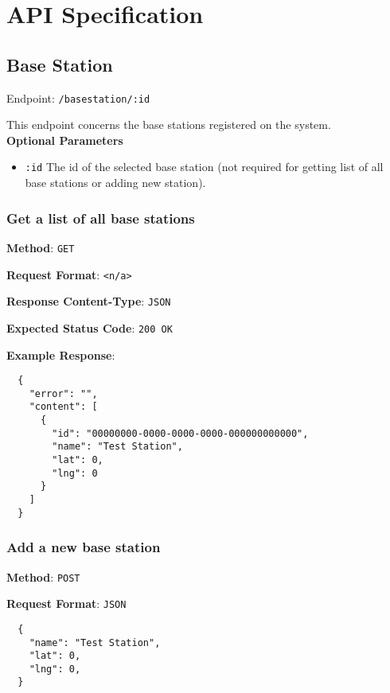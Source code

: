 \chapter{API Specification}

\section{Base Station}

Endpoint: \texttt{/basestation/:id}

\noindent
This endpoint concerns the base stations registered on the system.\\

\noindent
\textbf{Optional Parameters}
\begin{itemize}
   \item \texttt{:id} \textemdash The id of the selected base station (not required for getting list of all base stations or adding new station).
\end{itemize}


\subsection{Get a list of all base stations}

\noindent
\textbf{Method}: \texttt{GET}

\noindent
\textbf{Request Format}: \texttt{<n/a>}

\noindent
\textbf{Response Content-Type}: \texttt{JSON}

\noindent
\textbf{Expected Status Code}: \texttt{200 OK}

\noindent
\textbf{Example Response}:
\begin{verbatim}
  { 
    "error": "",
    "content": [
      {
        "id": "00000000-0000-0000-0000-000000000000",
        "name": "Test Station",
        "lat": 0,
        "lng": 0
      }
    ]
  }
\end{verbatim}


\subsection{Add a new base station}

\noindent
\textbf{Method}: \texttt{POST}

\noindent
\textbf{Request Format}: \texttt{JSON}
\begin{verbatim}
  { 
    "name": "Test Station",
    "lat": 0,
    "lng": 0,
  }
\end{verbatim}

